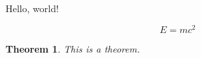 \documentclass{article}
\newtheorem{theorem}{Theorem}
\begin{document}
Hello, world!

\[
E = mc^2
\]

\begin{theorem}
This is a theorem.
\end{theorem}
\end{document}
